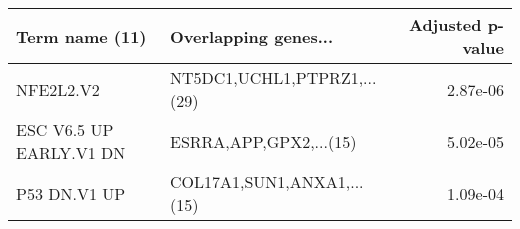 \begin{tabular}{llr}
\toprule
         Term name (11) &        Overlapping genes... &  Adjusted p-value \\
\midrule
              NFE2L2.V2 & NT5DC1,UCHL1,PTPRZ1,...(29) &          2.87e-06 \\
ESC V6.5 UP EARLY.V1 DN &      ESRRA,APP,GPX2,...(15) &          5.02e-05 \\
           P53 DN.V1 UP &  COL17A1,SUN1,ANXA1,...(15) &          1.09e-04 \\
\bottomrule
\end{tabular}
